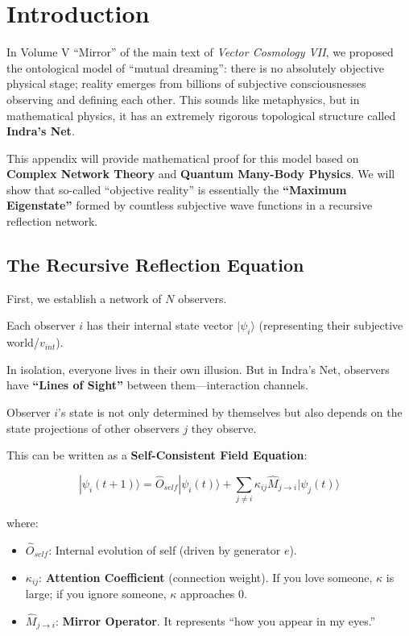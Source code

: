 \section{Introduction}

In Volume V ``Mirror'' of the main text of \textit{Vector Cosmology VII}, we proposed the ontological model of ``mutual dreaming'': there is no absolutely objective physical stage; reality emerges from billions of subjective consciousnesses observing and defining each other. This sounds like metaphysics, but in mathematical physics, it has an extremely rigorous topological structure called \textbf{Indra's Net}.

This appendix will provide mathematical proof for this model based on \textbf{Complex Network Theory} and \textbf{Quantum Many-Body Physics}. We will show that so-called ``objective reality'' is essentially the \textbf{``Maximum Eigenstate''} formed by countless subjective wave functions in a recursive reflection network.

\subsection{The Recursive Reflection Equation}

First, we establish a network of $N$ observers.

Each observer $i$ has their internal state vector $|\psi_i\rangle$ (representing their subjective world/$v_{int}$).

In isolation, everyone lives in their own illusion. But in Indra's Net, observers have \textbf{``Lines of Sight''} between them---interaction channels.

Observer $i$'s state is not only determined by themselves but also depends on the state projections of other observers $j$ they observe.

This can be written as a \textbf{Self-Consistent Field Equation}:

\[|\psi_i(t+1)\rangle = \hat{O}_{self} |\psi_i(t)\rangle + \sum_{j \neq i} \kappa_{ij} \hat{M}_{j \to i} |\psi_j(t)\rangle\]

where:

\begin{itemize}
\item \textbf{$\hat{O}_{self}$}: Internal evolution of self (driven by generator $e$).

\item \textbf{$\kappa_{ij}$}: \textbf{Attention Coefficient} (connection weight). If you love someone, $\kappa$ is large; if you ignore someone, $\kappa$ approaches 0.

\item \textbf{$\hat{M}_{j \to i}$}: \textbf{Mirror Operator}. It represents ``how you appear in my eyes.''
\end{itemize}

